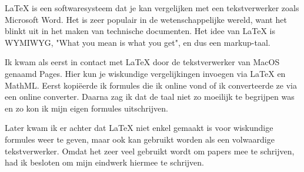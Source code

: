 \LaTeX{} is een softwaresysteem dat je kan vergelijken met een tekstverwerker zoals Microsoft Word. Het is zeer populair in de wetenschappelijke wereld, want het blinkt uit in het maken van technische documenten. Het idee van \LaTeX{} is WYMIWYG, "What you mean is what you get", en dus een markup\hyp{}taal.

Ik kwam als eerst in contact met \LaTeX{} door de tekstverwerker van MacOS genaamd Pages. Hier kun je wiskundige vergelijkingen invoegen via \LaTeX{} en MathML. Eerst kopi\"eerde ik formules die ik online vond of ik converteerde ze via een online converter. Daarna zag ik dat de taal niet zo moeilijk te begrijpen was en zo kon ik mijn eigen formules uitschrijven.

Later kwam ik er achter dat \LaTeX{} niet enkel gemaakt is voor wiskundige formules weer te geven, maar ook kan gebruikt worden als een volwaardige tekstverwerker. Omdat het zeer veel gebruikt wordt om papers mee te schrijven, had ik besloten om mijn eindwerk hiermee te schrijven.

